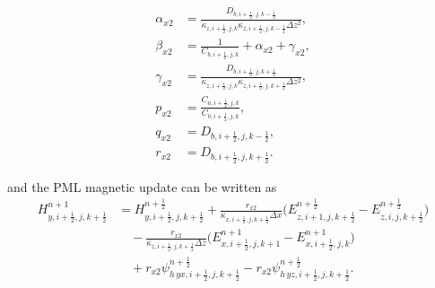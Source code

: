 \documentclass{article}
\numberwithin{equation}{section}
\numberwithin{figure}{section}
\begin{document}
\begin{align}
    \alpha_{x2} & =\frac{D_{b,i+\tfrac12,j,k-\tfrac12}}{\kappa_{z,i+\tfrac12,j,k}\kappa_{z,i+\tfrac12,j,k-\tfrac12}\Delta z^2}, \\
    \beta_{x2}  & =\frac{1}{C_{b,i+\tfrac12,j,k}}+\alpha_{x2}+\gamma_{x2},                                                      \\
    \gamma_{x2} & =\frac{D_{b,i+\tfrac12,j,k+\tfrac12}}{\kappa_{z,i+\tfrac12,j,k}\kappa_{z,i+\tfrac12,j,k+\tfrac12}\Delta z^2}, \\
    p_{x2}      & =\frac{C_{a,i+\tfrac12,j,k}}{C_{b,i+\tfrac12,j,k}},                                                           \\
    q_{x2}      & =D_{b,i+\tfrac12,j,k-\tfrac12},                                                                               \\
    r_{x2}      & =D_{b,i+\tfrac12,j,k+\tfrac12}.
\end{align}

and the PML magnetic update can be written as
\begin{equation}
    \begin{aligned}
        H_{y,i+\tfrac12,j,k+\tfrac12}^{n+1}
         & = H_{y,i+\tfrac12,j,k+\tfrac12}^{n+\frac12}
        +\frac{r_{x2}}{\kappa_{x,i+\tfrac12,j,k+\tfrac12}\Delta x}
        \Big(E_{z,i+1,j,k+\tfrac12}^{n+\frac12}-E_{z,i,j,k+\tfrac12}^{n+\frac12}\Big) \\
         & \quad
        -\frac{r_{x2}}{\kappa_{z,i+\tfrac12,j,k+\tfrac12}\Delta z}
        \Big(E_{x,i+\tfrac12,j,k+1}^{n+1}-E_{x,i+\tfrac12,j,k}^{n+1}\Big)             \\
         & \quad
        +r_{x2}\psi^{n+\frac12}_{h\,yx,i+\tfrac12,j,k+\tfrac12}
        -r_{x2}\psi^{n+\frac12}_{h\,yz,i+\tfrac12,j,k+\tfrac12}.
    \end{aligned}
    \label{eq:adi-second-hy-pml}
\end{equation}
\end{document}
